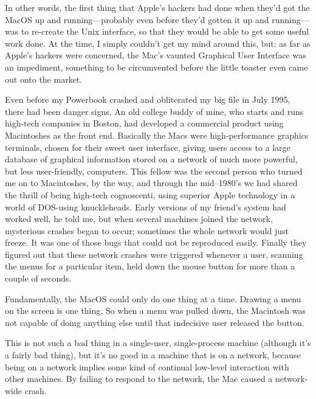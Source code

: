 \documentclass[
  fontsize=11pt,
  paper=landscape,
  twocolumn=true,
  pagesize=pdftex,
  headings=small,
  DIV=15,
  ]{scrartcl}
\begin{document}
In other words, the first thing that Apple's hackers had done when
they'd got the MacOS up and running---probably even before they'd gotten
it up and running---was to re-create the Unix interface, so that they
would be able to get some useful work done. At the time, I simply
couldn't get my mind around this, but: as far as Apple's hackers were
concerned, the Mac's vaunted Graphical User Interface was an impediment,
something to be circumvented before the little toaster even came out
onto the market.

Even before my Powerbook crashed and obliterated my big file in July
1995, there had been danger signs. An old college buddy of mine, who
starts and runs high-tech companies in Boston, had developed a
commercial product using Macintoshes as the front end. Basically the
Macs were high-performance graphics terminals, chosen for their sweet
user interface, giving users access to a large database of graphical
information stored on a network of much more powerful, but less
user-friendly, computers. This fellow was the second person who turned
me on to Macintoshes, by the way, and through the mid--1980's we had
shared the thrill of being high-tech cognoscenti, using superior Apple
technology in a world of DOS-using knuckleheads. Early versions of my
friend's system had worked well, he told me, but when several machines
joined the network, mysterious crashes began to occur; sometimes the
whole network would just freeze. It was one of those bugs that could not
be reproduced easily. Finally they figured out that these network
crashes were triggered whenever a user, scanning the menus for a
particular item, held down the mouse button for more than a couple of
seconds.

Fundamentally, the MacOS could only do one thing at a time. Drawing a
menu on the screen is one thing. So when a menu was pulled down, the
Macintosh was not capable of doing anything else until that indecisive
user released the button.

This is not such a bad thing in a single-user, single-process machine
(although it's a fairly bad thing), but it's no good in a machine that
is on a network, because being on a network implies some kind of
continual low-level interaction with other machines. By failing to
respond to the network, the Mac caused a network-wide crash.
\end{document}

